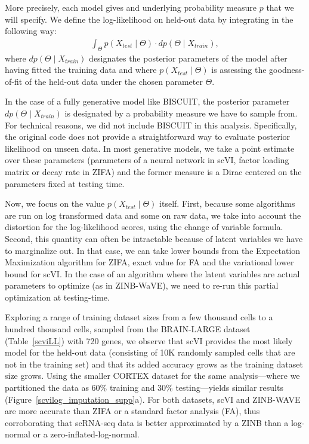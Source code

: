 More precisely, each model gives and underlying probability measure $p$ that we will specify. We define the log-likelihood on held-out data by integrating in the following way: 
\begin{align}
\int_{\Theta} p(X_{test} \mid \Theta)\cdot dp(\Theta \mid X_{train}),
\end{align}
where $dp(\Theta \mid X_{train})$ designates the posterior parameters of the model after having fitted the training data and where $p(X_{test} \mid \Theta)$ is assessing the goodness-of-fit of the held-out data under the chosen parameter $\Theta$.

In the case of a fully generative model like BISCUIT, the posterior parameter $dp(\Theta \mid X_{train})$ is designated by a probability measure we have to sample from. For technical reasons, we did not include BISCUIT in this analysis. Specifically, the original code does not provide a straightforward way to evaluate posterior likelihood on unseen data. In most generative models, we take a point estimate over these parameters (parameters of a neural network in scVI, factor loading matrix or decay rate in ZIFA) and the former measure is a Dirac centered on the parameters fixed at testing time. 

Now, we focus on the value $p(X_{test} \mid \Theta)$ itself. First, because some algorithms are run on log transformed data and some on raw data, we take into account the distortion for the log-likelihood scores, using the change of variable formula. Second, this quantity can often be intractable because of latent variables we have to marginalize out. In that case, we can take lower bounds from the Expectation Maximization algorithm for ZIFA, exact value for FA and the variational lower bound for scVI. In the case of an algorithm where the latent variables are actual parameters to optimize (as in ZINB-WaVE), we need to re-run this partial optimization at testing-time. 

Exploring a range of training dataset sizes from a few thousand cells to a hundred thousand cells, sampled from the BRAIN-LARGE dataset (Table~\ref{scviLL}) with 720 genes, we observe that scVI provides the most likely model for the held-out data (consisting of 10K randomly sampled cells that are not in the training set) and that its added accuracy grows as the training dataset size grows. Using the smaller CORTEX dataset for the same analysis---where we partitioned the data as 60\% training and 30\% testing---yields similar results (Figure~\ref{scvilog_imputation_supp}a). For both datasets, scVI and ZINB-WAVE are more accurate than ZIFA or a standard factor analysis (FA), thus corroborating that scRNA-seq data is better approximated by a ZINB than a log-normal or a zero-inflated-log-normal.

